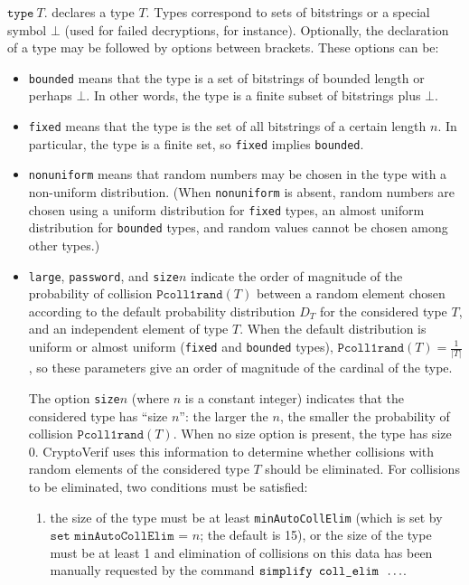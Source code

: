 \begin{itemize}
$\texttt{type}\ T\texttt{.}$ declares a type $T$. Types correspond to sets
of bitstrings or a special symbol $\bot$ (used for failed decryptions, 
for instance). Optionally, the declaration of a type may be followed by options
between brackets. These options can be:
\begin{itemize}

\item \texttt{bounded} means that the type is a set of bitstrings of
bounded length or perhaps $\bot$. In other words, the type is a finite
subset of bitstrings plus $\bot$.

\item \texttt{fixed} means that the type is the set of all bitstrings of 
a certain length $n$. In particular, the type is a finite set,
so \texttt{fixed} implies \texttt{bounded}. 

\item \texttt{nonuniform} means that random numbers may be chosen in the
type with a non-uniform distribution. (When \texttt{nonuniform} is absent,
random numbers are chosen using a uniform distribution for {\tt fixed} types,
an almost uniform distribution for \texttt{bounded} types, and random values
cannot be chosen among other types.)

\item \texttt{large}, \texttt{password}, and \texttt{size$n$} indicate 
the order of magnitude of the probability of collision $\texttt{Pcoll1rand}(T)$
between a random element
chosen according to the default probability distribution $D_T$ for the considered type $T$,
and an independent element of type $T$. When the default distribution is uniform
or almost uniform ({\tt fixed} and {\tt bounded} types), $\texttt{Pcoll1rand}(T) = \frac{1}{|T|}$,
so these parameters give an order of magnitude of the cardinal of the type.

The option \texttt{size$n$} (where $n$ is a constant integer) indicates
that the considered type has ``size $n$'': the larger the $n$, the
smaller the probability of collision $\texttt{Pcoll1rand}(T)$.
When no size option is present, the type has size 0.
CryptoVerif uses this information to determine whether collisions 
with random elements of the considered type $T$ should be eliminated.
For collisions to be eliminated, two conditions must be satisfied:
\begin{enumerate}

\item the size of the type must be at least \texttt{minAutoCollElim}
(which is set by $\texttt{set minAutoCollElim = }n$; the default is 15),
or the size of the type must be at least 1 and elimination of collisions
on this data has been manually requested by the command 
$\texttt{simplify coll\string_elim }\ldots$.


\end{enumerate}
\end{itemize}
\end{itemize}
